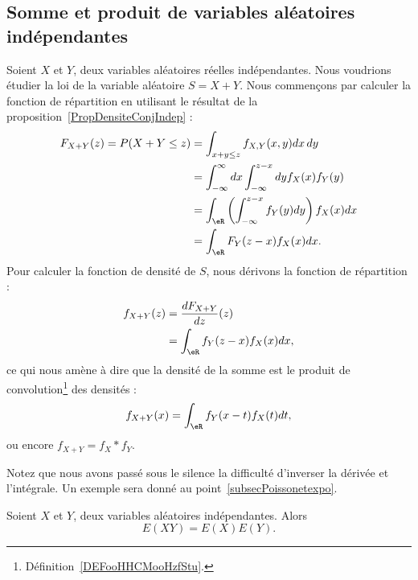 \subsection{Somme et produit de variables aléatoires indépendantes}
\label{subsecscnvommevariablsindep}


Soient \( X\) et \( Y\), deux variables aléatoires réelles indépendantes. Nous voudrions étudier la loi de la variable aléatoire \( S=X+Y\). Nous commençons par calculer la fonction de répartition en utilisant le résultat de la proposition~\ref{PropDensiteConjIndep} :
\begin{subequations}
    \begin{align}
        F_{X+Y}(z)=P(X+Y\leq z)&=\int_{x+y\leq z}f_{X,Y}(x,y)dx\,dy\\
        &=\int_{-\infty}^{\infty}dx\int_{-\infty}^{z-x}dyf_X(x)f_Y(y)\\
        &=\int_{\eR}\left( \int_{-\infty}^{z-x}f_Y(y)dy \right)f_X(x)dx\\
        &=\int_{\eR}F_Y(z-x)f_X(x)dx.
    \end{align}
\end{subequations}
Pour calculer la fonction de densité de \( S\), nous dérivons la fonction de répartition :
\begin{subequations}
    \begin{align}
        f_{X+Y}(z)&=\frac{ d F_{X+Y} }{ d z }(z)\\
        &=\int_{\eR}f_Y(z-x)f_X(x)dx,
    \end{align}
\end{subequations}
ce qui nous amène à dire que la densité de la somme est le produit de convolution\footnote{Définition~\ref{DEFooHHCMooHzfStu}.} des densités :
\begin{equation}        \label{EqdensitesooemXYint}
    f_{X+Y}(x)=\int_{\eR}f_Y(x-t)f_X(t)dt,
\end{equation}
ou encore \( f_{X+Y}=f_X* f_Y\).

Notez que nous avons passé sous le silence la difficulté d'inverser la dérivée et l'intégrale. Un exemple sera donné au point~\ref{subsecPoissonetexpo}.

\begin{lemma}       \label{LemEXYEXEYprodindep}
    Soient \( X\) et \( Y\), deux variables aléatoires indépendantes. Alors
    \begin{equation}
        E(XY)=E(X)E(Y).
    \end{equation}
\end{lemma}

